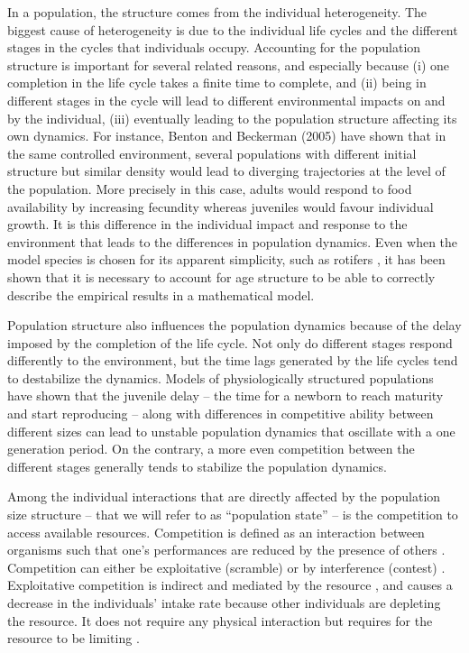 In a population, the structure comes from the individual heterogeneity.
The biggest cause of heterogeneity is due to the individual life cycles and the
different stages in the cycles that individuals occupy. Accounting for
the population structure is important for several related reasons, and
especially because (i) one completion in the life cycle takes a finite time to
complete, and (ii) being in different stages in the cycle will lead to different
environmental impacts on and by the individual, (iii) eventually leading to the
population structure affecting its own dynamics. For instance, Benton and
Beckerman (2005) have shown that in the same controlled environment, several
populations with different initial structure but similar density would lead to
diverging trajectories at the level of the population. More precisely in this
case, adults would respond to food availability by increasing fecundity whereas
juveniles would favour individual growth. It is this difference in the
individual impact and response to the environment that leads to the differences
in population dynamics. Even when the model species is chosen for its apparent
simplicity, such as rotifers \autocites{fussmann2005ecological}, it has
been shown that it is necessary to account for age structure to be able to
correctly describe the empirical results in a mathematical model.

Population structure also influences the population dynamics because of
the delay imposed by the completion of the life cycle. Not only do
different stages respond differently to the environment, but the time lags
generated by the life cycles tend to destabilize the dynamics. Models of
physiologically structured populations have shown that the juvenile delay – the
time for a newborn to reach maturity and start reproducing – along with
differences in competitive ability between different sizes can lead to unstable
population dynamics that oscillate with a one generation period. On the
contrary, a more even competition between the different stages generally tends to
stabilize the population dynamics.

Among the individual interactions that are directly affected by the population
size structure – that we will refer to as “population state” – is the
competition to access available resources. Competition is defined as an
interaction between organisms such that one’s performances are reduced by the
presence of others
\autocites{volterra1931a,gause1932a,park1948a,park1954a,park1957a}.
Competition can either be exploitative (scramble) or by interference (contest)
\autocites{park1954a,park1962a,begon2009a}. Exploitative competition is indirect
and mediated by the resource
\autocites{goss-custard1980a,vance1984a,begon2009a}, and causes a decrease in
the individuals’ intake rate because other individuals are depleting the
resource. It does not require any physical interaction but requires for the
resource to be limiting \autocites{begon2009a}.

